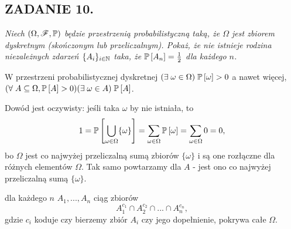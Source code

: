 \documentclass{article}
\begin{document}
\subsection*{ZADANIE 10.}
\emph{\color{pink}Niech $(\Omega, \mathcal{F},\mathbb{P})$ będzie przestrzenią probabilistyczną taką, że $\Omega$ jest zbiorem dyskretnym (skończonym lub przeliczalnym). Pokaż, że nie istnieje rodzina niezależnych zdarzeń $\{A_i\}_{i\in \mathbb{N}}$ taka, że $\mathbb{P}\left[A_n\right]=\frac12$ dla każdego $n$.}

 W przestrzeni probabilistycznej dyskretnej $(\exists\;\omega\in\Omega)\;\mathbb{P}\left[\omega\right]>0$ a nawet więcej, $(\forall\;A\subseteq\Omega,\mathbb{P}\left[A\right]>0)(\exists\;\omega\in A)\;\mathbb{P}\left[A\right]$.

Dowód jest oczywisty: jeśli taka $\omega$ by nie istniała, to
$$1=\mathbb{P}\left[\bigcup\limits_{\omega\in\Omega}\{\omega\}\right]=\sum\limits_{\omega\in\Omega}\mathbb{P}\left[\omega\right]=\sum\limits_{\omega\in\Omega}0=0,$$
bo $\Omega$ jest co najwyżej przeliczalną sumą zbiorów $\{\omega\}$ i są one rozłączne dla różnych elementów $\Omega$. Tak samo powtarzamy dla $A$ - jest ono co najwyżej przeliczalną sumą $\{\omega\}$.
\medskip

\begin{center}
\end{center}
\medskip

 dla każdego $n$ $A_1,...,A_n$ ciąg zbiorów
$$A_1^{c_1}\cap A_2^{c_2}\cap...\cap A_n^{c_n},$$
gdzie $c_i$ koduje czy bierzemy zbiór $A_i$ czy jego dopełnienie, pokrywa całe $\Omega$.
\end{document}
